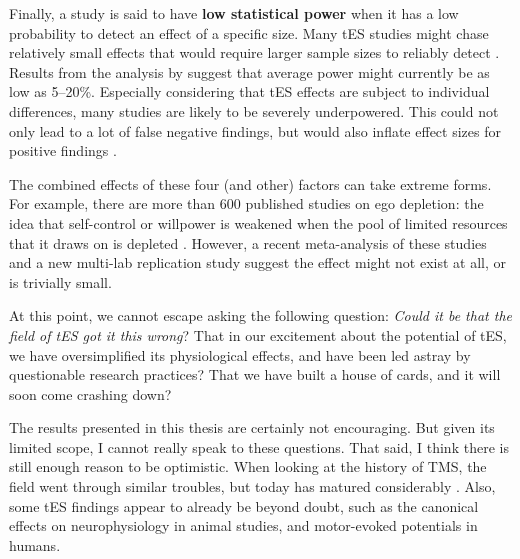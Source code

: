 \documentclass[11pt,]{memoir}
\begin{document}
Finally, a study is said to have \textbf{low statistical power} when it has a low probability to detect an effect of a specific size. Many tES studies might chase relatively small effects that would require larger sample sizes to reliably detect \autocite{Minarik2016}. Results from the analysis by \textcite{Medina2017} suggest that average power might currently be as low as 5--20\%. Especially considering that tES effects are subject to individual differences, many studies are likely to be severely underpowered. This could not only lead to a lot of false negative findings, but would also inflate effect sizes for positive findings \autocite{Button2013}.

The combined effects of these four (and other) factors can take extreme forms. For example, there are more than 600 published studies on ego depletion: the idea that self-control or willpower is weakened when the pool of limited resources that it draws on is depleted \autocite{Inzlicht2012}. However, a recent meta-analysis of these studies \autocite{Carter2015} and a new multi-lab replication study \autocite{Hagger2016} suggest the effect might not exist at all, or is trivially small.

At this point, we cannot escape asking the following question: \emph{Could it be that the field of tES got it this wrong}? That in our excitement about the potential of tES, we have oversimplified its physiological effects, and have been led astray by questionable research practices? That we have built a house of cards, and it will soon come crashing down?

The results presented in this thesis are certainly not encouraging. But given its limited scope, I cannot really speak to these questions. That said, I think there is still enough reason to be optimistic. When looking at the history of TMS, the field went through similar troubles, but today has matured considerably \autocite{Parkin2015}. Also, some tES findings appear to already be beyond doubt, such as the canonical effects on neurophysiology in animal studies, and motor-evoked potentials in humans.
\end{document}
